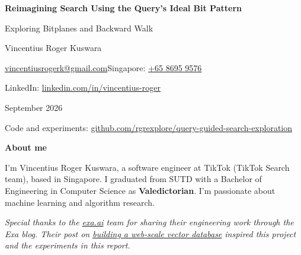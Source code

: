 \documentclass[11pt,a4paper]{article}
\begin{document}
\setlength{\abovedisplayskip}{7pt}
\setlength{\belowdisplayskip}{7pt}
{\Large\bfseries\color{Ink} Reimagining Search Using the Query's Ideal Bit Pattern}\par
{\large Exploring Bitplanes and Backward Walk}\par
\vspace{6pt}
{\normalsize Vincentius Roger Kuswara}\par
{\small \href{mailto:vincentiusrogerk@gmail.com}{vincentiusrogerk@gmail.com}\quad\textbar\quad Singapore: \href{tel:+6586959576}{+65 8695 9576}}\par
{\small LinkedIn: \href{https://www.linkedin.com/in/vincentius-roger}{linkedin.com/in/vincentius-roger}}\par
{\small September 2026}\par
{\small Code and experiments: \href{https://github.com/rgrexplore/query-guided-search-exploration}{github.com/rgrexplore/query-guided-search-exploration}}\par
\vspace{12pt}
{\footnotesize\textbf{About me}\par I'm Vincentius Roger Kuswara, a software engineer at TikTok (TikTok Search team), based in Singapore. I graduated from SUTD with a Bachelor of Engineering in Computer Science as \textbf{Valedictorian}. I'm passionate about machine learning and algorithm research.\par}
\vspace{8pt}
{\small\itshape Special thanks to the \href{https://exa.ai}{exa.ai} team for sharing their engineering work through the Exa blog. Their post on \href{https://exa.ai/blog/building-web-scale-vector-db}{building a web-scale vector database} inspired this project and the experiments in this report.}\par
\setcounter{tocdepth}{2}
\tableofcontents
\clearpage




\end{document}
